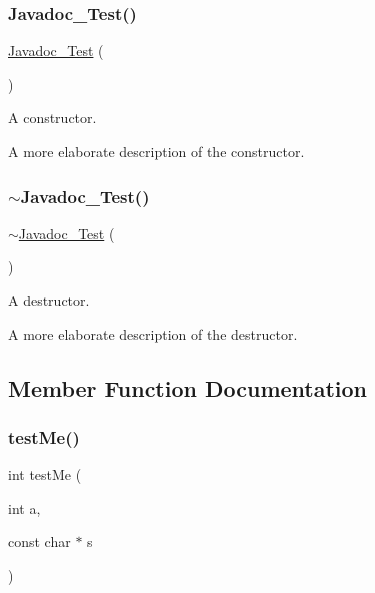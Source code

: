 \subsubsection{\texorpdfstring{Javadoc\+\_\+\+Test()}{Javadoc\_Test()}}
{\footnotesize\ttfamily \mbox{\hyperlink{class_javadoc___test}{Javadoc\+\_\+\+Test}} (\begin{DoxyParamCaption}{ }\end{DoxyParamCaption})}



A constructor. 

A more elaborate description of the constructor. \mbox{\label{class_javadoc___test_abda4d40f58e25104c7087e435fb0ddd0}} 
\subsubsection{\texorpdfstring{$\sim$\+Javadoc\+\_\+\+Test()}{~Javadoc\_Test()}}
{\footnotesize\ttfamily $\sim$\mbox{\hyperlink{class_javadoc___test}{Javadoc\+\_\+\+Test}} (\begin{DoxyParamCaption}{ }\end{DoxyParamCaption})}



A destructor. 

A more elaborate description of the destructor. 

\subsection{Member Function Documentation}
\mbox{\label{class_javadoc___test_af1299ea1b7efeb1548c7aba201ebe756}} 
\subsubsection{\texorpdfstring{test\+Me()}{testMe()}}
{\footnotesize\ttfamily int test\+Me (\begin{DoxyParamCaption}\item[{int}]{a,  }\item[{const char $\ast$}]{s }\end{DoxyParamCaption})}



